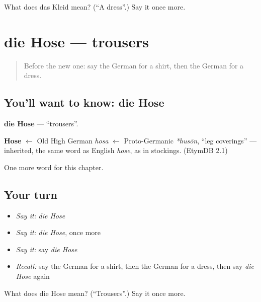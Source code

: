 \begin{tcolorbox}[breakable,colback=teal!4,colframe=teal!35!black,title={Before you move on}]
What does das Kleid mean? (\textquotedblleft{}A dress\textquotedblright{}.) Say it once more.
\end{tcolorbox}
\section[die Hose]{die Hose — trousers}

\label{lesson:GE-C99-hose}



\begin{quote}
Before the new one: say the German for a shirt, then the German for a dress.
\end{quote}

\subsection*{You'll want to know: die Hose}
\textbf{die Hose} — \textquotedblleft{}trousers\textquotedblright{}.

\begin{cousinweb}
\textbf{Hose} $\leftarrow$ Old High German \emph{hosa} $\leftarrow$ Proto-Germanic \emph{*husōn}, \textquotedblleft{}leg coverings\textquotedblright{} — inherited, the same word as English \emph{hose}, as in stockings. (EtymDB 2.1)
\end{cousinweb}

\begin{grammarlens}[title={What you've built}]
One more word for this chapter.
\end{grammarlens}

\subsection*{Your turn}
\begin{itemize}
\raggedright
  \item \emph{Say it:} \emph{die Hose}
  \item \emph{Say it:} \emph{die Hose}, once more
  \item \emph{Say it:} say \emph{die Hose}
  \item \emph{Recall:} say the German for a shirt, then the German for a dress, then say \emph{die Hose} again
\end{itemize}

\begin{tcolorbox}[breakable,colback=teal!4,colframe=teal!35!black,title={Before you move on}]
What does die Hose mean? (\textquotedblleft{}Trousers\textquotedblright{}.) Say it once more.
\end{tcolorbox}
